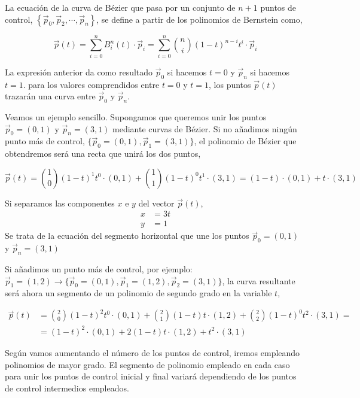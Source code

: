 La ecuación de la curva de Bézier que pasa por un conjunto de $n+1$ puntos de control, $\left\lbrace\vec{p}_0, \vec{p}_2, \cdots, \vec{p}_n\right\rbrace$, se define a partir de los polinomios de Bernstein como,

\begin{equation*}
\vec{p}(t) = \sum_{i = 0}^n B_i^n(t) \cdot \vec{p}_i = \sum_{i = 0}^n \binom{n}{i}\left(1-t\right)^{n-i}t^i  \cdot \vec{p}_i
\end{equation*}

La expresión anterior da como resultado $\vec{p}_0$ si hacemos $t = 0$ y $\vec{p}_n$ si hacemos $t = 1$. para los valores comprendidos entre $t=0$ y $t=1$, los puntos $\vec{p}(t)$  trazarán una curva entre $\vec{p}_0$  y $\vec{p}_n$.

Veamos un ejemplo sencillo. Supongamos que queremos unir los puntos $\vec{p}_0 = (0,1)$ y $\vec{p}_n = (3,1)$ mediante curvas de Bézier. Si no añadimos ningún punto más de control, $\lbrace\vec{p}_0 = (0,1), \vec{p}_1 = (3,1)\rbrace$, el polinomio de Bézier que obtendremos será una recta que unirá los dos puntos,

\begin{equation*}
\vec{p}(t) = \binom{1}{0}\left(1-t\right)^{1}t^0  \cdot (0,1) +  \binom{1}{1}\left(1-t\right)^{0}t^1  \cdot (3,1) = \left(1-t\right)  \cdot (0,1) + t\cdot (3,1)
\end{equation*} 

Si separamos las componentes $x$ e $y$ del vector $\vec{p}(t)$,
\begin{align*}
x &= 3t\\
y &= 1
\end{align*}
Se trata de la ecuación del segmento horizontal que une los puntos $\vec{p}_0 = (0,1)$ y $\vec{p}_n = (3,1)$ 

Si añadimos un punto más de control, por ejemplo:  $\vec{p}_1 = (1,2) \rightarrow \lbrace\vec{p}_0 = (0,1), \vec{p}_1 = (1,2), \vec{p}_2 = (3,1)\rbrace$,  la curva resultante será ahora un segmento de un polinomio de segundo grado en la variable $t$,

\begin{align*}
\vec{p}(t) &= \binom{2}{0}\left(1-t\right)^{2}t^0  \cdot (0,1) +  \binom{2}{1}\left(1-t\right)t \cdot (1,2) + \binom{2}{2}\left(1-t\right)^{0}t^2  \cdot (3,1) =\\
&= \left(1-t\right)^{2} \cdot (0,1) + 2 \left(1-t\right)t \cdot (1,2) + t^2  \cdot (3,1) 
\end{align*} 

Según vamos aumentando el número de los puntos de control, iremos empleando polinomios de mayor grado. El segmento de polinomio empleado en cada caso para unir los puntos de control inicial y final variará dependiendo de los puntos de control intermedios empleados.

